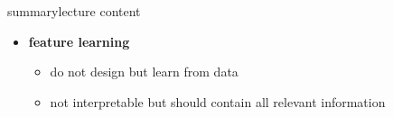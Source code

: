 \begin{frame}{summary}{lecture content}
\begin{itemize}
\begin{itemize}
                    \end{itemize}
                \bigskip
                \item   \textbf{feature learning}
                    \begin{itemize}
                        \item   do not design but learn from data
                        \item   not interpretable but should contain all relevant information
                    \end{itemize}
            \end{itemize}
        \end{frame}

